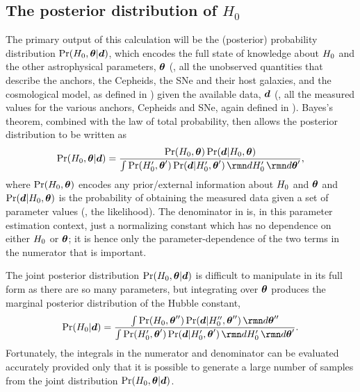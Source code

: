 \documentclass[a4paper,fleqn,usenatbib]{mnras}
\begin{document}
{\subsection{The posterior distribution of \mbox{\boldmath$H_0$}}

The primary output of this calculation will be
the (posterior) probability distribution 
${\rm{Pr}}(H_0, \mbox{\boldmath ${\theta}$} | \mbox{\boldmath ${d}$})$,
which encodes 
the full state of knowledge about
$H_0$ and 
the other astrophysical parameters, $\mbox{\boldmath ${\theta}$}$ 
(\ie, all the unobserved quantities 
that describe the anchors, the Cepheids, the SNe and their
host galaxies, and the cosmological model, 
as defined in )
given 
the available data, $\mbox{\boldmath ${d}$}$
(\ie, all the measured values for the various anchors, Cepheids and SNe,
again defined in ).
Bayes's theorem,
combined with the law of total probability,
then allows the posterior distribution to be written as 
\begin{equation}
\label{equation:bt}
\prob(\hubble, \nuisance | \data)
  = \frac{\prob(\hubble, \nuisance) \, 
  \prob(\data | \hubble, \nuisance)}
  {\int \prob(\hubble^\prime, \nuisance^\prime) \, 
  \prob(\data | \hubble^\prime, \nuisance^\prime) 
  \, \diff \hubble^\prime \, \diff \nuisance^\prime},
\end{equation}
where 
${\rm{Pr}}(H_0, \mbox{\boldmath ${\theta}$})$ encodes any prior/external
information about $H_0$ and $\mbox{\boldmath ${\theta}$}$
and 
${\rm{Pr}}(\mbox{\boldmath ${d}$} | H_0, \mbox{\boldmath ${\theta}$})$
is the probability of obtaining the measured
data given a set of parameter values (\ie, the likelihood).
The denominator in  is, in this parameter estimation context, 
just a normalizing constant which has no dependence on either
$H_0$ or $\mbox{\boldmath ${\theta}$}$; it is hence only the parameter-dependence
of the two terms in the numerator that is important.

The joint posterior distribution 
${\rm{Pr}}(H_0, \mbox{\boldmath ${\theta}$} | \mbox{\boldmath ${d}$})$ is 
difficult to manipulate in its full form
as there are so many parameters,
but integrating 
over $\mbox{\boldmath ${\theta}$}$ 
produces the
marginal posterior distribution of the Hubble constant,
\begin{equation}
\prob(\hubble | \data)
  = \frac
  {\int \prob(\hubble, \nuisance^{\prime\prime}) \, 
  \prob(\data | \hubble^{\prime\prime}, \nuisance^{\prime\prime}) 
  \, \diff \nuisance^{\prime\prime}}
  {\int \prob(\hubble^\prime, \nuisance^\prime) \, 
  \prob(\data | \hubble^\prime, \nuisance^\prime) 
  \, \diff \hubble^\prime \, \diff \nuisance^\prime}.
\end{equation}
Fortunately, the integrals in the numerator and denominator 
can be evaluated accurately provided only that it is 
possible to generate a large number of samples from 
the joint distribution ${\rm{Pr}}(H_0, \mbox{\boldmath ${\theta}$} | \mbox{\boldmath ${d}$})$.

}
\end{document}
